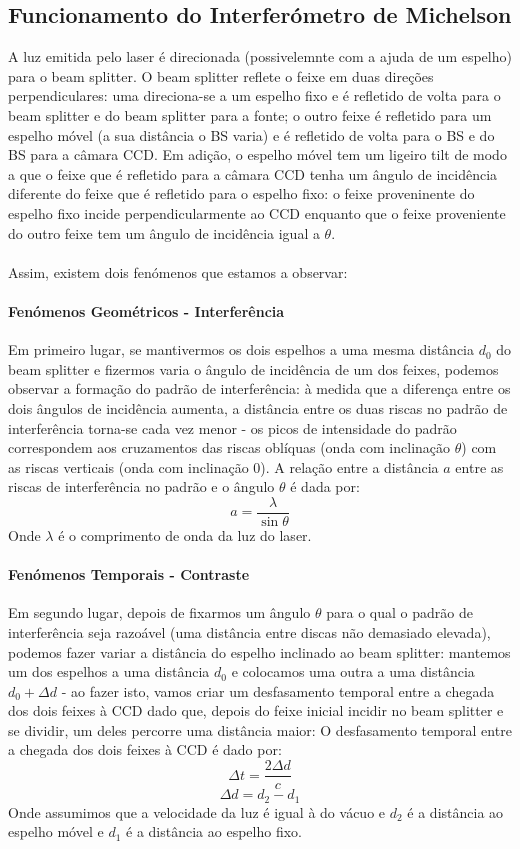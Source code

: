 \documentclass{article}
\begin{document}
\begin{multicols}{2}
\subsection{Funcionamento do Interferómetro de Michelson}

A luz emitida pelo laser é direcionada (possivelemnte com a ajuda de um espelho) para o beam splitter.
O beam splitter reflete o feixe em duas direções perpendiculares: uma direciona-se a um espelho fixo e é refletido de volta para o beam splitter e do beam splitter para a fonte; o outro feixe é refletido para um espelho móvel (a sua distância o BS varia) e é refletido de volta para o BS e do BS para a câmara CCD.
Em adição, o espelho móvel tem um ligeiro tilt de modo a que o feixe que é refletido para a câmara CCD tenha um ângulo de incidência diferente do feixe que é refletido para o espelho fixo: o feixe proveninente do espelho fixo incide perpendicularmente ao CCD enquanto que o feixe proveniente do outro feixe tem um ângulo de incidência igual a $\theta$.
\paragraph{} 
Assim, existem dois fenómenos que estamos a observar: 
\paragraph{Fenómenos Geométricos - Interferência}
Em primeiro lugar, se mantivermos os dois espelhos a uma mesma distância $d_0$ do beam splitter e fizermos varia o ângulo de incidência de um dos feixes, podemos observar a formação do padrão de interferência: à medida que a diferença entre os dois ângulos de incidência aumenta, a distância entre os duas riscas no padrão de interferência torna-se cada vez menor - 
os picos de intensidade do padrão correspondem aos cruzamentos das riscas oblíquas (onda com inclinação $\theta$) com as riscas verticais (onda com inclinação $0$).
A relação entre a distância $a$ entre as riscas de interferência no padrão e o ângulo $\theta$ é dada por:
\[ a = \frac{\lambda}{\sin \theta} \]
Onde $\lambda$ é o comprimento de onda da luz do laser.
\paragraph{Fenómenos Temporais - Contraste}
Em segundo lugar, depois de fixarmos um ângulo $\theta$ para o qual o padrão de interferência seja razoável (uma distância entre discas não demasiado elevada), podemos fazer variar a distância do espelho inclinado ao beam splitter: mantemos um dos espelhos a uma distância $d_0$ e colocamos uma outra a uma distância $d_0 + \Delta d$ - ao fazer isto, vamos criar um desfasamento temporal entre a chegada dos dois feixes à CCD dado que, depois do feixe inicial incidir no beam splitter e se dividir, um deles percorre uma distância maior:
O desfasamento temporal entre a chegada dos dois feixes à CCD é dado por:
\[ \Delta t = \frac{2 \Delta d}{c} \]
\[ \Delta d = d_2 - d_1 \]
Onde assumimos que a velocidade da luz é igual à do vácuo e $d_2$ é a distância ao espelho móvel e $d_1$ é a distância ao espelho fixo.

\end{multicols}
\end{document}
